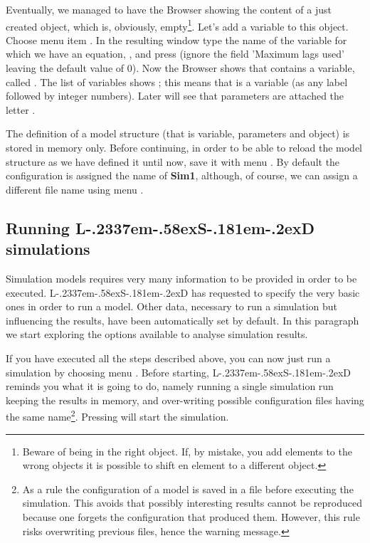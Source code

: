 \documentclass [11pt,a4paper] {book}
\def\LsD{{L\kern-.2337em\lower-.58ex\hbox{S}\kern-.181em\lower-.2ex\hbox{D}}\xspace}
\begin{document}
Eventually, we managed to have the Browser showing the content of a just created object,
which is, obviously, empty\footnote{Beware of being in the right object. If, by mistake,
you add elements to the wrong objects it is possible to shift en element to a different object.}.
 Let's add a variable to this object. Choose menu item
. In the resulting window type the name of the variable for
which we have an equation, , and press  (ignore the field 'Maximum lags
used' leaving the default value of 0). Now the Browser shows that  contains a
variable, called . The list of variables shows ; this means that
 is a variable (as any label followed by integer numbers). Later will see that
parameters are attached the letter .


The definition of a model structure (that is variable, parameters and object) is stored
in memory only. Before continuing, in order to be able to reload the model structure as
we have defined it until now, save it with menu . By default the
configuration is assigned the name of \textbf{Sim1}, although, of course, we can assign a different file name using menu .


\subsection{Running \LsD simulations}
Simulation models requires very many information to be provided in order to be executed.
\LsD has requested to specify the very basic ones in order to run a model. Other data, necessary to run a simulation but 
influencing the results, have been automatically set
by default. In this paragraph we start exploring the options available to analyse simulation results.

If you have executed all the steps described above, you can now just run a simulation by
choosing menu . Before starting, \LsD reminds you what it is going to do,
namely running a single simulation run keeping the results in memory, and over-writing possible 
configuration files having the same name\footnote{As a rule the configuration of a model is saved in a file before executing the simulation. This avoids that possibly interesting results cannot be reproduced because one forgets the configuration that produced them. However, this rule risks overwriting previous files, hence the warning message.}. Pressing  will start the simulation.
\end{document}
